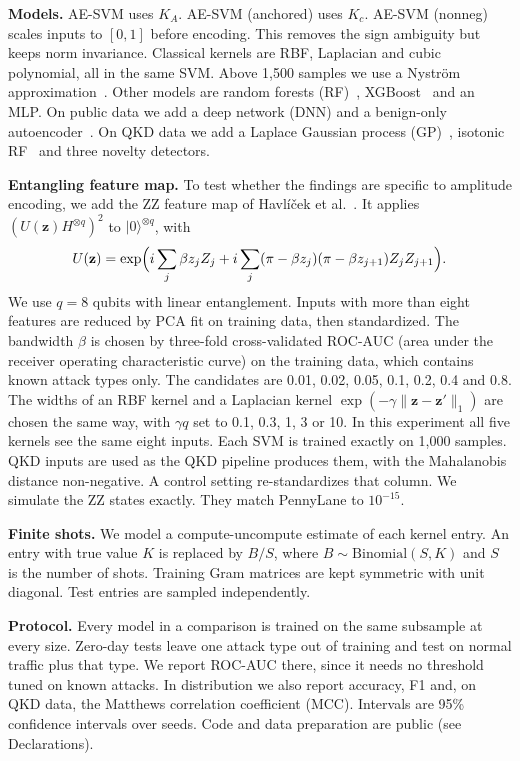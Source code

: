 \documentclass[pdflatex,sn-mathphys-num,lineno]{sn-jnl}
\theoremstyle{thmstyleone}
\begin{document}
\textbf{Models.} AE-SVM uses $K_A$. AE-SVM (anchored) uses $K_c$. AE-SVM (nonneg)
scales inputs to $[0,1]$ before encoding. This removes the sign ambiguity but keeps
norm invariance. Classical kernels are RBF, Laplacian and cubic polynomial, all in
the same SVM. Above 1,500 samples we use a Nystr\"om
approximation~\cite{williams2001nystrom}. Other models are random forests
(RF)~\cite{breiman2001random}, XGBoost~\cite{chen2016xgboost} and an MLP. On public
data we add a deep network (DNN) and a benign-only
autoencoder~\cite{mirsky2018kitsune}. On QKD data we add a Laplace Gaussian process
(GP)~\cite{rasmussen2006gaussian}, isotonic RF~\cite{zadrozny2002transforming} and
three novelty detectors.

\textbf{Entangling feature map.} To test whether the findings are specific to
amplitude encoding, we add the ZZ feature map of Havl\'i\v{c}ek et
al.~\cite{havlicek2019supervised}. It applies $(U(\mathbf{z})H^{\otimes q})^2$ to
$|0\rangle^{\otimes q}$, with
\begin{equation}
U(\mathbf{z})=\exp\Bigl(i\sum_{j} \beta z_j Z_j
+ i\sum_{j} (\pi-\beta z_j)(\pi-\beta z_{j+1}) Z_jZ_{j+1}\Bigr).
\end{equation}
We use $q=8$ qubits with linear entanglement. Inputs with more than eight features
are reduced by PCA fit on training data, then standardized. The bandwidth $\beta$
is chosen by three-fold cross-validated ROC-AUC (area under the receiver operating
characteristic curve) on the training data, which contains
known attack types only. The candidates are 0.01, 0.02, 0.05, 0.1, 0.2, 0.4 and
0.8. The widths of an
RBF kernel and a Laplacian kernel $\exp(-\gamma\|\mathbf{z}-\mathbf{z}'\|_1)$ are
chosen the same way, with $\gamma q$ set to 0.1, 0.3, 1, 3 or 10. In this experiment all
five kernels see the same eight inputs. Each SVM is trained exactly on 1,000
samples. QKD inputs are used as the QKD pipeline produces them, with the
Mahalanobis distance non-negative. A control setting re-standardizes that column. We simulate the ZZ states exactly. They match
PennyLane to $10^{-15}$.

\textbf{Finite shots.} We model a compute-uncompute estimate of each kernel entry.
An entry with true value $K$ is replaced by $B/S$, where $B\sim\mathrm{Binomial}(S,K)$
and $S$ is the number of shots. Training Gram matrices are kept symmetric with unit
diagonal. Test entries are sampled independently.

\textbf{Protocol.} Every model in a comparison is trained on the same subsample at
every size. Zero-day tests leave one attack type out of training and test on
normal traffic plus that type. We report ROC-AUC there, since it needs no threshold
tuned on known attacks. In distribution we also report accuracy, F1 and, on QKD
data, the Matthews correlation coefficient (MCC). Intervals are 95\% confidence intervals over seeds. Code
and data preparation are public (see Declarations).
\end{document}
